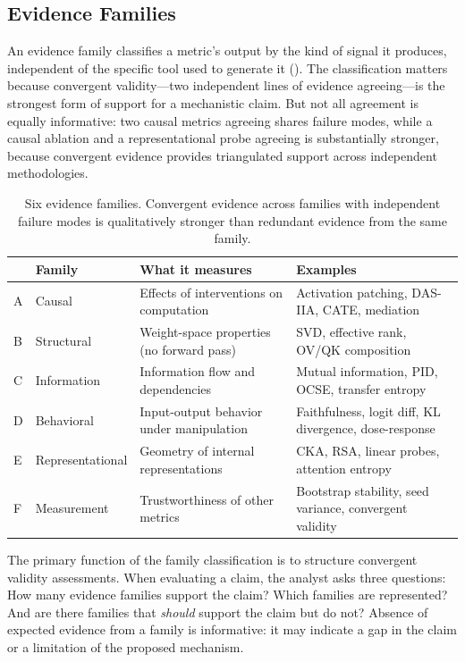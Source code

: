 \documentclass[10pt]{article}
\begin{document}
\subsection{Evidence Families}
\label{sec:evidence-families}

An evidence family classifies a metric's output by the kind of signal it produces, independent of the specific tool used to generate it (). The classification matters because convergent validity---two independent lines of evidence agreeing---is the strongest form of support for a mechanistic claim. But not all agreement is equally informative: two causal metrics agreeing shares failure modes, while a causal ablation and a representational probe agreeing is substantially stronger, because convergent evidence provides triangulated support across independent methodologies.

\begin{table}[H]
\centering
\small
\caption{Six evidence families. Convergent evidence across families with independent failure modes is qualitatively stronger than redundant evidence from the same family.}
\label{tab:families}
\renewcommand{\arraystretch}{1.2}
\begin{tabular}{@{}ll>{\raggedright\arraybackslash}p{4.5cm}>{\raggedright\arraybackslash}p{5cm}@{}}
\toprule
& \textbf{Family} & \textbf{What it measures} & \textbf{Examples} \\
\midrule
A & Causal & Effects of interventions on computation & Activation patching, DAS-IIA, CATE, mediation \\
\midrule
B & Structural & Weight-space properties (no forward pass) & SVD, effective rank, OV/QK composition \\
\midrule
C & Information & Information flow and dependencies & Mutual information, PID, OCSE, transfer entropy \\
\midrule
D & Behavioral & Input-output behavior under manipulation & Faithfulness, logit diff, KL divergence, dose-response \\
\midrule
E & Representational & Geometry of internal representations & CKA, RSA, linear probes, attention entropy \\
\midrule
F & Measurement & Trustworthiness of other metrics & Bootstrap stability, seed variance, convergent validity \\
\bottomrule
\end{tabular}
\end{table}

The primary function of the family classification is to structure convergent validity assessments. When evaluating a claim, the analyst asks three questions: How many evidence families support the claim? Which families are represented? And are there families that \emph{should} support the claim but do not? Absence of expected evidence from a family is informative: it may indicate a gap in the claim or a limitation of the proposed mechanism.
\end{document}
